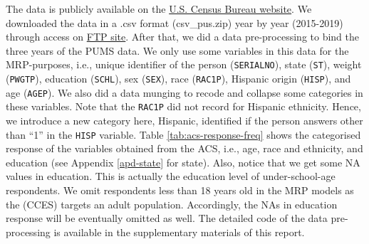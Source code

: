 \documentclass{monashthesis}
\begin{document}
The data is publicly available on the \href{https://www.census.gov/programs-surveys/acs/microdata/access.2015.html}{U.S. Census Bureau website}. We downloaded the data in a .csv format (csv\_pus.zip) year by year (2015-2019) through access on \href{https://www2.census.gov/programs-surveys/acs/data/pums/2015/1-Year/}{FTP site}. After that, we did a data pre-processing to bind the three years of the PUMS data. We only use some variables in this data for the MRP-purposes, i.e., unique identifier of the person (\texttt{SERIALNO}), state (\texttt{ST}), weight (\texttt{PWGTP}), education (\texttt{SCHL}), sex (\texttt{SEX}), race (\texttt{RAC1P}), Hispanic origin (\texttt{HISP}), and age (\texttt{AGEP}). We also did a data munging to recode and collapse some categories in these variables. Note that the \texttt{RAC1P} did not record for Hispanic ethnicity. Hence, we introduce a new category here, Hispanic, identified if the person answers other than ``1'' in the \texttt{HISP} variable. Table \ref{tab:acs-response-freq} shows the categorised response of the variables obtained from the ACS, i.e., age, race and ethnicity, and education (see Appendix \ref{apd-state} for state). Also, notice that we get some NA values in education. This is actually the education level of under-school-age respondents. We omit respondents less than 18 years old in the MRP models as the (CCES) targets an adult population. Accordingly, the NAs in education response will be eventually omitted as well. The detailed code of the data pre-processing is available in the supplementary materials of this report.
\end{document}
